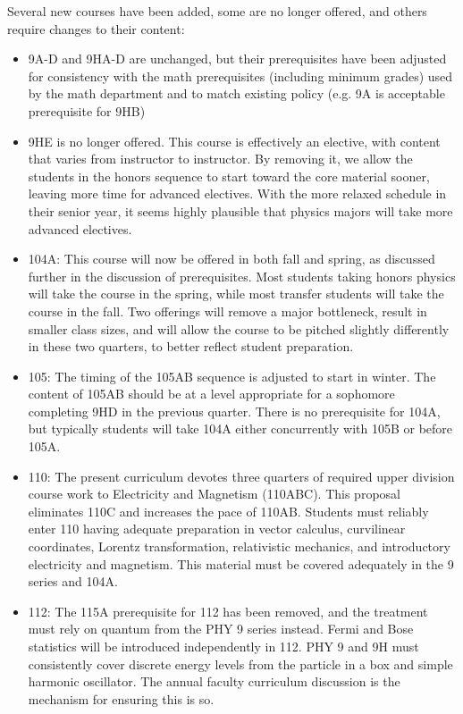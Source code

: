 \documentclass[12pt]{article}
\begin{document}
Several new courses have been added, some are no longer offered, and
others require changes to their content:
\begin{itemize}

\item 9A-D and 9HA-D are unchanged, but their prerequisites have been
  adjusted for consistency with the math prerequisites (including
  minimum grades) used by the math department and to match existing
  policy (e.g. 9A is acceptable prerequisite for 9HB)

\item 9HE is no longer offered.  This course is effectively an
  elective, with content that varies from instructor to instructor.
  By removing it, we allow the students in the honors sequence to
  start toward the core material sooner, leaving more time for
  advanced electives. With the more relaxed schedule in their senior
  year, it seems highly plausible that physics majors will take more
  advanced electives.

\item 104A: This course will now be offered in both fall and spring,
  as discussed further in the discussion of prerequisites.  Most
  students taking honors physics will take the course in the spring,
  while most transfer students will take the course in the fall.  Two
  offerings will remove a major bottleneck, result in smaller class sizes,
  and will allow the course to be pitched slightly differently in
  these two quarters, to better reflect student preparation.

\item 105: The timing of the 105AB sequence is adjusted to start in
  winter.  The content of 105AB should be at a level appropriate for a
  sophomore completing 9HD in the previous quarter.  There is no prerequisite for
  104A, but typically students will take 104A either concurrently with
  105B or before 105A.

\item 110: The present curriculum devotes three quarters of required
  upper division course work to Electricity and Magnetism (110ABC).
  This proposal eliminates 110C and increases the pace of 110AB.
  Students must reliably enter 110 having adequate preparation in
  vector calculus, curvilinear coordinates, Lorentz transformation,
  relativistic mechanics, and introductory electricity and magnetism.
  This material must be covered adequately in the 9 series and 104A.

\item 112: The 115A prerequisite for 112 has been removed, and the
  treatment must rely on quantum from the PHY 9 series instead.  Fermi
  and Bose statistics will be introduced independently in 112.  PHY 9
  and 9H must consistently cover discrete energy levels from the
  particle in a box and simple harmonic oscillator.  The annual
  faculty curriculum discussion is the mechanism for ensuring this is
  so.
    

\end{itemize}
\end{document}
